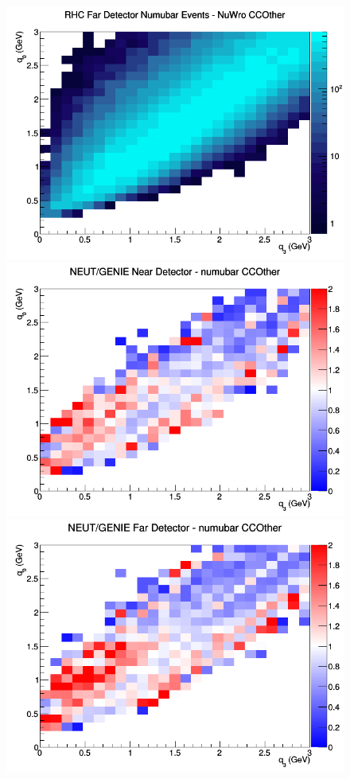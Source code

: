 \documentclass[12pt]{article}
\begin{document}
\begin{figure}[h]
\endminipage
{}
\includegraphics[width=\linewidth]{eff_q0_q3/LAr/CCOther_RHC_FD_numubar_q3_q0_NuWro.png}
\endminipage
\newline
{}
\includegraphics[width=\linewidth]{eff_q0_q3/LAr/ratios/CCOther_NEUT_GENIE_numubar_near_q3_q0.png}
\endminipage
{}
\includegraphics[width=\linewidth]{eff_q0_q3/LAr/ratios/CCOther_NEUT_GENIE_numubar_far_q3_q0.png}

\end{figure}
\end{document}

